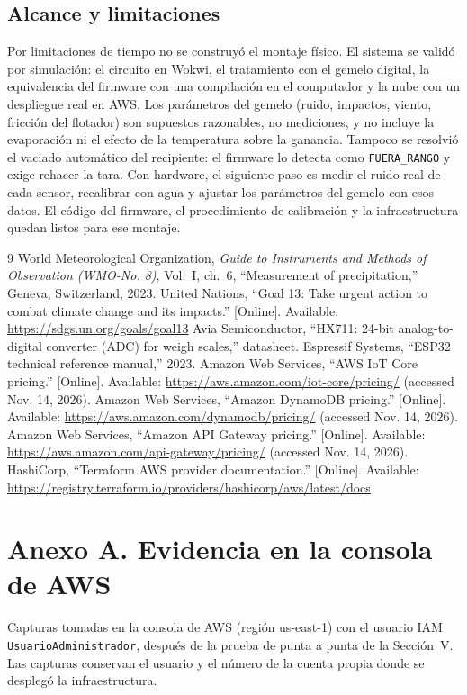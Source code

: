 \documentclass[10pt,twocolumn,letterpaper]{article}
\begin{document}
\subsection{Alcance y limitaciones}
Por limitaciones de tiempo no se construyó el montaje físico. El sistema se validó por simulación: el circuito en Wokwi, el tratamiento con el gemelo digital, la equivalencia del firmware con una compilación en el computador y la nube con un despliegue real en AWS. Los parámetros del gemelo (ruido, impactos, viento, fricción del flotador) son supuestos razonables, no mediciones, y no incluye la evaporación ni el efecto de la temperatura sobre la ganancia. Tampoco se resolvió el vaciado automático del recipiente: el firmware lo detecta como \texttt{FUERA\_RANGO} y exige rehacer la tara. Con hardware, el siguiente paso es medir el ruido real de cada sensor, recalibrar con agua y ajustar los parámetros del gemelo con esos datos. El código del firmware, el procedimiento de calibración y la infraestructura quedan listos para ese montaje.

\begin{thebibliography}{9}\footnotesize
{} World Meteorological Organization, \emph{Guide to Instruments and Methods of Observation (WMO-No. 8)}, Vol.~I, ch.~6, ``Measurement of precipitation,'' Geneva, Switzerland, 2023.
 United Nations, ``Goal 13: Take urgent action to combat climate change and its impacts.'' [Online]. Available: \url{https://sdgs.un.org/goals/goal13}
 Avia Semiconductor, ``HX711: 24-bit analog-to-digital converter (ADC) for weigh scales,'' datasheet.
 Espressif Systems, ``ESP32 technical reference manual,'' 2023.
 Amazon Web Services, ``AWS IoT Core pricing.'' [Online]. Available: \url{https://aws.amazon.com/iot-core/pricing/} (accessed Nov. 14, 2026).
 Amazon Web Services, ``Amazon DynamoDB pricing.'' [Online]. Available: \url{https://aws.amazon.com/dynamodb/pricing/} (accessed Nov. 14, 2026).
 Amazon Web Services, ``Amazon API Gateway pricing.'' [Online]. Available: \url{https://aws.amazon.com/api-gateway/pricing/} (accessed Nov. 14, 2026).
 HashiCorp, ``Terraform AWS provider documentation.'' [Online]. Available: \url{https://registry.terraform.io/providers/hashicorp/aws/latest/docs}
\end{thebibliography}

\onecolumn
\section*{Anexo A. Evidencia en la consola de AWS}
\noindent Capturas tomadas en la consola de AWS (región us-east-1) con el usuario IAM \texttt{UsuarioAdministrador}, después de la prueba de punta a punta de la Sección~V. Las capturas conservan el usuario y el número de la cuenta propia donde se desplegó la infraestructura.
\end{document}
